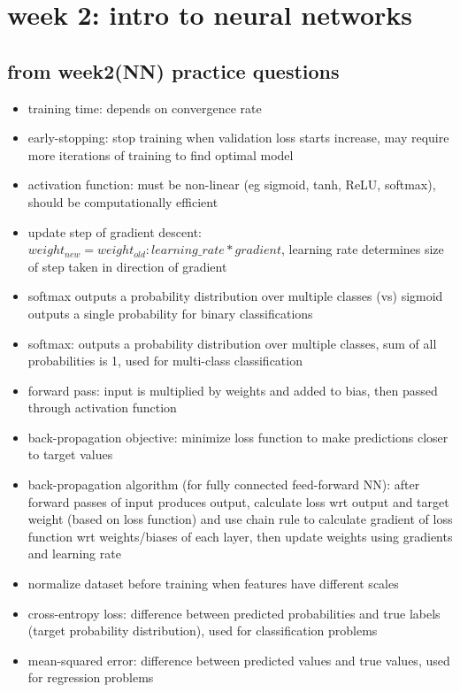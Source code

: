 \documentclass[10pt]{article}
\begin{document}
\pagebreak
\section*{week 2: intro to neural networks}

\subsection*{from week2(NN) practice questions}
\begin{itemize}[label=\(\star\), leftmargin=1em, itemsep=-0.3em]
    \item training time: depends on convergence rate
    \item early-stopping: stop training when validation loss starts increase, may require more iterations of training to find optimal model
    \item activation function: must be non-linear (eg sigmoid, tanh, ReLU, softmax), should be computationally efficient
    \item update step of gradient descent: $weight_{new} = weight_{old}: learning\_rate * gradient$, learning rate determines size of step taken in direction of gradient
    \item softmax outputs a probability distribution over multiple classes (vs) sigmoid outputs a single probability for binary classifications
    \item softmax: outputs a probability distribution over multiple classes, sum of all probabilities is 1, used for multi-class classification
    \item forward pass: input is multiplied by weights and added to bias, then passed through activation function
    \item back-propagation objective: minimize loss function to make predictions closer to target values
    \item back-propagation algorithm (for fully connected feed-forward NN): after forward passes of input produces output, calculate loss wrt output and target weight (based on loss function) and use chain rule to calculate gradient of loss function wrt weights/biases of each layer, then update weights using gradients and learning rate
    \item normalize dataset before training when features have different scales
    \item cross-entropy loss: difference between predicted probabilities and true labels (target probability distribution), used for classification problems
    \item mean-squared error: difference between predicted values and true values, used for regression problems
\end{itemize}
\end{document}
